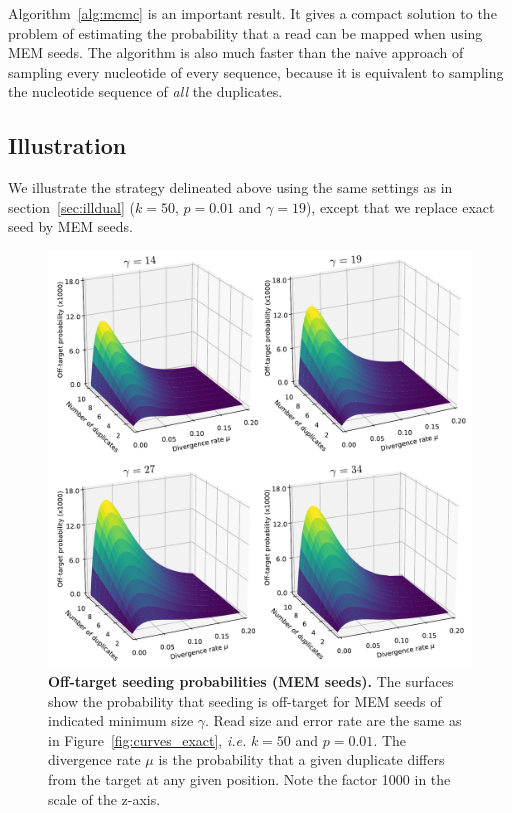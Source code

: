 \documentclass{article}
\begin{document}
Algorithm~\ref{alg:mcmc} is an important result. It gives a compact
solution to the problem of estimating the probability that a read can be
mapped when using MEM seeds. The algorithm is also much faster than the
naive approach of sampling every nucleotide of every sequence, because it
is equivalent to sampling the nucleotide sequence of \emph{all} the
duplicates.

\subsection{Illustration}
\label{sec:illmem}

We illustrate the strategy delineated above using the same settings as in
section~\ref{sec:illdual} ($k=50$, $p=0.01$ and $\gamma=19$), except that
we replace exact seed by MEM seeds.

\begin{figure}[h]
\centering
\includegraphics[scale=.48]{curves_mem.pdf}
\caption{\textbf{Off-target seeding probabilities (MEM seeds).}
The surfaces show the probability that seeding is off-target for MEM seeds
of indicated minimum size $\gamma$. Read size and error rate are the same
as in Figure~\ref{fig:curves_exact}, \textit{i.e.} $k=50$ and $p=0.01$.
The divergence rate $\mu$ is the probability that a given duplicate
differs from the target at any given position. Note the factor 1000 in the
scale of the z-axis.}
\label{fig:curves_mem}
\end{figure}
\end{document}
